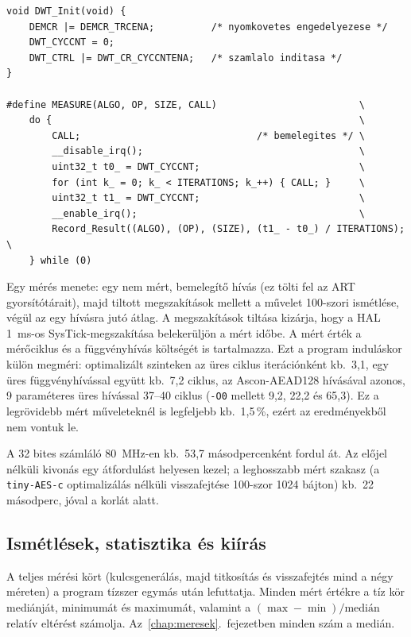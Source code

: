 \documentclass[a4paper,12pt]{report}
\theoremstyle{definition}
\theoremstyle{remark}
\begin{document}
\noindent\begin{minipage}{\textwidth}
\begin{verbatim}
void DWT_Init(void) {
    DEMCR |= DEMCR_TRCENA;          /* nyomkovetes engedelyezese */
    DWT_CYCCNT = 0;
    DWT_CTRL |= DWT_CR_CYCCNTENA;   /* szamlalo inditasa */
}

#define MEASURE(ALGO, OP, SIZE, CALL)                         \
    do {                                                      \
        CALL;                               /* bemelegites */ \
        __disable_irq();                                      \
        uint32_t t0_ = DWT_CYCCNT;                            \
        for (int k_ = 0; k_ < ITERATIONS; k_++) { CALL; }     \
        uint32_t t1_ = DWT_CYCCNT;                            \
        __enable_irq();                                       \
        Record_Result((ALGO), (OP), (SIZE), (t1_ - t0_) / ITERATIONS); \
    } while (0)
\end{verbatim}
\label{lst:dwt}
\end{minipage}

\medskip

Egy mérés menete: egy nem mért, bemelegítő hívás (ez tölti fel az ART gyorsítótárait), majd tiltott megszakítások mellett a művelet 100-szori ismétlése, végül az egy hívásra jutó átlag. A megszakítások tiltása kizárja, hogy a HAL 1~ms-os SysTick-megszakítása belekerüljön a mért időbe. A mért érték a mérőciklus és a függvényhívás költségét is tartalmazza. Ezt a program induláskor külön megméri: optimalizált szinteken az üres ciklus iterációnként kb.\ 3,1, egy üres függvényhívással együtt kb.\ 7,2 ciklus, az Ascon-AEAD128 hívásával azonos, 9 paraméteres üres hívással 37--40 ciklus (\texttt{-O0} mellett 9,2, 22,2 és 65,3). Ez a legrövidebb mért műveleteknél is legfeljebb kb.\ 1,5\,\%, ezért az eredményekből nem vontuk le.

A 32 bites számláló 80~MHz-en kb.\ 53,7 másodpercenként fordul át. Az előjel nélküli kivonás egy átfordulást helyesen kezel; a leghosszabb mért szakasz (a \texttt{tiny-AES-c} optimalizálás nélküli visszafejtése 100-szor 1024 bájton) kb.\ 22 másodperc, jóval a korlát alatt.

\subsection{Ismétlések, statisztika és kiírás}

A teljes mérési kört (kulcsgenerálás, majd titkosítás és visszafejtés mind a négy méreten) a program tízszer egymás után lefuttatja. Minden mért értékre a tíz kör mediánját, minimumát és maximumát, valamint a $(\max - \min)/\text{medián}$ relatív eltérést számolja. Az~\ref{chap:meresek}.~fejezetben minden szám a medián.
\end{document}
